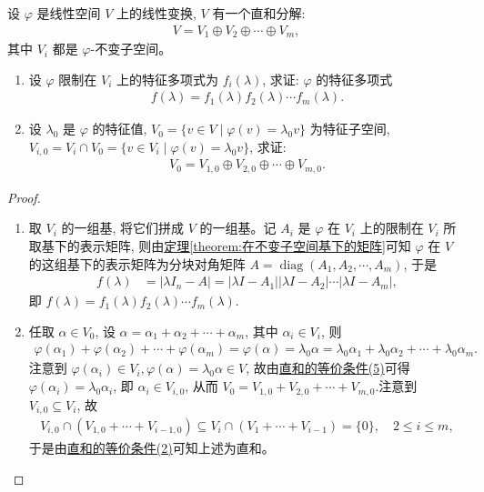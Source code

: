 \documentclass[../../main.tex]{subfiles}%
\begin{document}
\begin{proposition}\label{proposition:线性变换不变子空间直和分解与特征值的关系}
设 $\varphi$ 是线性空间 $V$ 上的线性变换, $V$ 有一个直和分解:
\begin{align*}
V = V_1 \oplus V_2 \oplus \cdots \oplus V_m,
\end{align*}
其中 $V_i$ 都是 $\varphi$-不变子空间。
\begin{enumerate}[(1)]
\item 设 $\varphi$ 限制在 $V_i$ 上的特征多项式为 $f_i(\lambda)$, 求证: $\varphi$ 的特征多项式
\begin{align*}
f(\lambda) = f_1(\lambda) f_2(\lambda) \cdots f_m(\lambda).
\end{align*}

\item  设 $\lambda_0$ 是 $\varphi$ 的特征值, $V_0 = \{v \in V \mid \varphi(v) = \lambda_0 v\}$ 为特征子空间, $V_{i,0} = V_i \cap V_0 = \{v \in V_i \mid \varphi(v) = \lambda_0 v\}$, 求证:
\begin{align*}
V_0 = V_{1,0} \oplus V_{2,0} \oplus \cdots \oplus V_{m,0}.
\end{align*}
\end{enumerate}
\end{proposition}
\begin{proof}
\begin{enumerate}[(1)]
\item  取 $V_i$ 的一组基, 将它们拼成 $V$ 的一组基。记 $A_i$ 是 $\varphi$ 在 $V_i$ 上的限制在 $V_i$ 所取基下的表示矩阵, 则由\hyperref[theorem:在不变子空间基下的矩阵]{定理\ref{theorem:在不变子空间基下的矩阵}}可知 $\varphi$ 在 $V$ 的这组基下的表示矩阵为分块对角矩阵 $A = \operatorname{diag}(A_1, A_2, \cdots, A_m)$, 于是
\begin{align*}
f(\lambda) &= |\lambda I_n - A| = |\lambda I - A_1| |\lambda I - A_2| \cdots |\lambda I - A_m|,
\end{align*}
即 $f(\lambda) = f_1(\lambda) f_2(\lambda) \cdots f_m(\lambda)$.

\item 任取 $\alpha \in V_0$, 设 $\alpha = \alpha_1 + \alpha_2 + \cdots + \alpha_m$, 其中 $\alpha_i \in V_i$, 则
\begin{align*}
\varphi(\alpha_1) + \varphi(\alpha_2) + \cdots + \varphi(\alpha_m) = \varphi(\alpha) = \lambda_0 \alpha = \lambda_0 \alpha_1 + \lambda_0 \alpha_2 + \cdots + \lambda_0 \alpha_m.
\end{align*}
注意到 $\varphi(\alpha_i) \in V_i,\varphi(\alpha) = \lambda_0 \alpha\in V$, 故由\hyperref[theorem:直和的等价条件]{直和的等价条件(5)}可得 $\varphi(\alpha_i) = \lambda_0 \alpha_i$, 即 $\alpha_i \in V_{i,0}$, 从而 $V_0=V_{1,0}+V_{2,0}+\cdots +V_{m,0}$.注意到 $V_{i,0} \subseteq V_i$, 故
\begin{align*}
V_{i,0} \cap (V_{1,0} + \cdots + V_{i-1,0}) \subseteq V_i \cap (V_1 + \cdots + V_{i-1}) = \{0\}, \quad 2 \leqslant  i \leqslant  m,
\end{align*}
于是由\hyperref[theorem:直和的等价条件]{直和的等价条件(2)}可知上述为直和。
\end{enumerate}
\end{proof}
\end{document}
